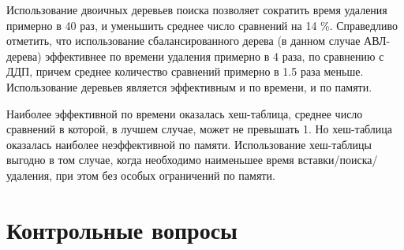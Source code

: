 Использование двоичных деревьев поиска позволяет сократить время удаления примерно в 40 раз, и уменьшить среднее число сравнений на 14 \%. Справедливо отметить, что использование сбалансированного дерева (в данном случае АВЛ-дерева) эффективнее по времени удаления примерно в 4 раза, по сравнению с ДДП, причем среднее количество сравнений примерно в 1.5 раза меньше. Использование деревьев является эффективным и по времени, и по памяти.

Наиболее эффективной по времени оказалась хеш-таблица, среднее число сравнений в которой, в лучшем случае, может не превышать 1. Но хеш-таблица оказалась наиболее неэффективной по памяти. Использование хеш-таблицы выгодно в том случае, когда необходимо наименьшее время вставки/поиска/удаления, при этом без особых ограничений по памяти.

\chapter{Контрольные вопросы}

